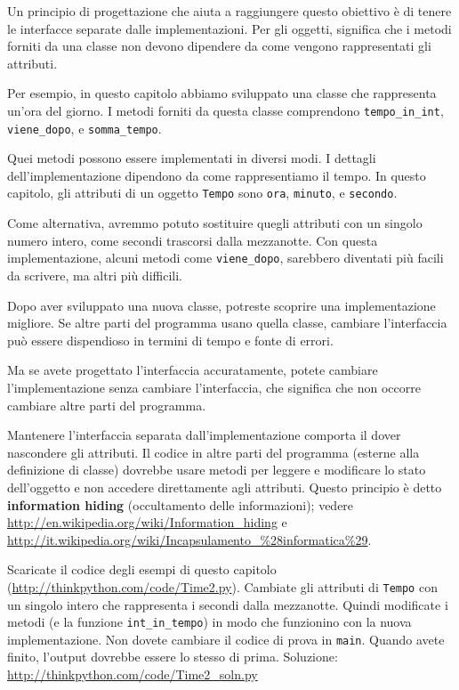 \documentclass[10pt]{book}
\begin{document}
Un principio di progettazione che aiuta a raggiungere questo obiettivo è di tenere le interfacce separate dalle implementazioni.
Per gli oggetti, significa che i metodi forniti da una classe non devono dipendere da come vengono rappresentati gli attributi.

Per esempio, in questo capitolo abbiamo sviluppato una classe che rappresenta un'ora del giorno. I metodi forniti da questa classe comprendono
\verb"tempo_in_int", \verb"viene_dopo", e \verb"somma_tempo".

Quei metodi possono essere implementati in diversi modi. I dettagli dell'implementazione dipendono da come rappresentiamo il tempo. In questo capitolo, gli attributi di un oggetto {\tt Tempo} sono {\tt ora}, {\tt minuto}, e {\tt secondo}.

Come alternativa, avremmo potuto sostituire quegli attributi con un singolo numero intero, come secondi trascorsi dalla mezzanotte. Con questa implementazione, alcuni metodi come \verb"viene_dopo", sarebbero diventati più facili da scrivere, ma altri più difficili.

Dopo aver sviluppato una nuova classe, potreste scoprire una implementazione migliore. Se altre parti del programma usano quella classe, cambiare l'interfaccia può essere dispendioso in termini di tempo e fonte di errori.  

Ma se avete progettato l'interfaccia accuratamente, potete cambiare l'implementazione senza cambiare l'interfaccia, che significa che non occorre cambiare altre parti del programma.

Mantenere l'interfaccia separata dall'implementazione comporta il dover nascondere gli attributi. Il codice in altre parti del programma (esterne alla definizione di classe) dovrebbe usare metodi per leggere e modificare lo stato dell'oggetto e non accedere direttamente agli attributi.  Questo principio è detto {\bf information hiding} (occultamento delle informazioni);
vedere \url{http://en.wikipedia.org/wiki/Information_hiding} e \url{http://it.wikipedia.org/wiki/Incapsulamento_%28informatica%29}.

\vspace{0.2in}
\begin{exercise}

Scaricate il codice degli esempi di questo capitolo
(\url{http://thinkpython.com/code/Time2.py}).  Cambiate gli attributi di {\tt Tempo} con un singolo intero che rappresenta i secondi dalla mezzanotte. Quindi modificate i metodi (e la funzione \verb"int_in_tempo") in modo che funzionino con la nuova implementazione. Non dovete cambiare il codice di prova in {\tt main}.  Quando avete finito, l'output dovrebbe essere lo stesso di prima. Soluzione: \url{http://thinkpython.com/code/Time2_soln.py}

\end{exercise}
\end{document}
